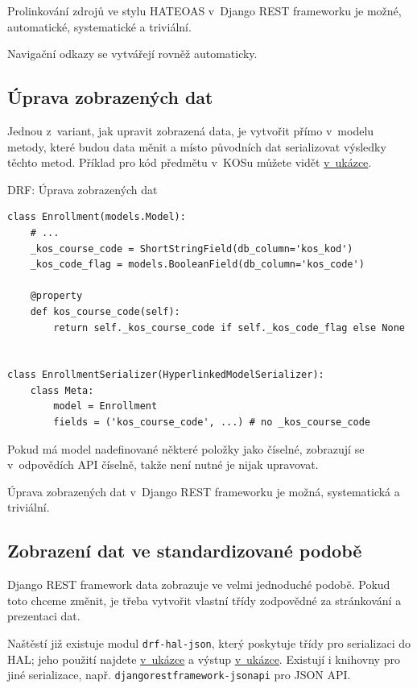 Prolinkování zdrojů ve stylu HATEOAS v~Django REST frameworku je možné, automatické, systematické a triviální.

Navigační odkazy se vytvářejí rovněž automaticky.

\subsection{Úprava zobrazených dat}\label{uxfaprava-zobrazenuxfdch-dat}

Jednou z~variant, jak upravit zobrazená data, je vytvořit přímo v~modelu metody, které budou data měnit a místo původních dat serializovat výsledky těchto metod. Příklad pro kód předmětu v~KOSu můžete vidět \protect\hyperlink{code:drf:modify}{v~ukázce}.

\begin{listing}[htbp]
\caption{{\label{code:drf:modify}DRF: Úprava zobrazených dat}}
\begin{verbatim}
class Enrollment(models.Model):
    # ...
    _kos_course_code = ShortStringField(db_column='kos_kod')
    _kos_code_flag = models.BooleanField(db_column='kos_code')

    @property
    def kos_course_code(self):
        return self._kos_course_code if self._kos_code_flag else None


class EnrollmentSerializer(HyperlinkedModelSerializer):
    class Meta:
        model = Enrollment
        fields = ('kos_course_code', ...) # no _kos_course_code
\end{verbatim}
\end{listing}

Pokud má model nadefinované některé položky jako číselné, zobrazují se v~odpovědích API číselně, takže není nutné je nijak upravovat.

Úprava zobrazených dat v~Django REST frameworku je možná, systematická a triviální.

\subsection{Zobrazení dat ve standardizované podobě}\label{zobrazenuxed-dat-ve-standardizovanuxe9-podobux11b}

Django REST framework data zobrazuje ve velmi jednoduché podobě. Pokud toto chceme změnit, je třeba vytvořit vlastní třídy zodpovědné za stránkování a prezentaci dat.

Naštěstí již existuje modul \verb!drf-hal-json!, který poskytuje třídy pro serializaci do HAL; jeho použití najdete \protect\hyperlink{code:drf:standard}{v~ukázce} a výstup \protect\hyperlink{code:drf:hal}{v~ukázce}. Existují i knihovny pro jiné serializace, např. \verb!djangorestframework-jsonapi! pro JSON API.

